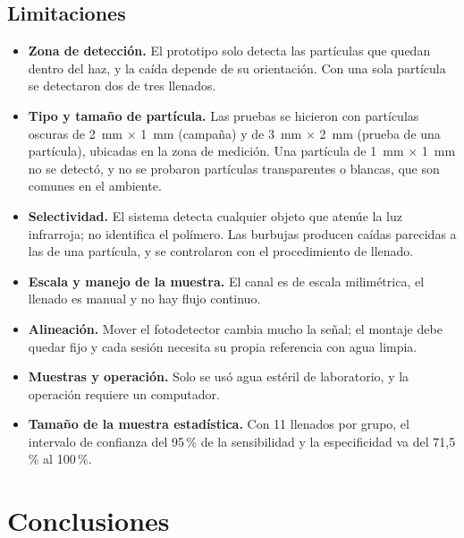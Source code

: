 \subsection{Limitaciones}

\begin{itemize}
  \item \textbf{Zona de detección.} El prototipo solo detecta las partículas que quedan
    dentro del haz, y la caída depende de su orientación. Con una sola partícula se
    detectaron dos de tres llenados.
  \item \textbf{Tipo y tamaño de partícula.} Las pruebas se hicieron con partículas
    oscuras de 2~mm $\times$ 1~mm (campaña) y de 3~mm $\times$ 2~mm (prueba de una
    partícula), ubicadas en la zona de medición. Una partícula de 1~mm
    $\times$ 1~mm no se detectó, y no se probaron partículas transparentes o blancas,
    que son comunes en el ambiente.
  \item \textbf{Selectividad.} El sistema detecta cualquier objeto que atenúe la luz
    infrarroja; no identifica el polímero. Las burbujas producen caídas parecidas a las
    de una partícula, y se controlaron con el procedimiento de llenado.
  \item \textbf{Escala y manejo de la muestra.} El canal es de escala milimétrica, el
    llenado es manual y no hay flujo continuo.
  \item \textbf{Alineación.} Mover el fotodetector cambia mucho la señal; el montaje debe
    quedar fijo y cada sesión necesita su propia referencia con agua limpia.
  \item \textbf{Muestras y operación.} Solo se usó agua estéril de laboratorio, y la
    operación requiere un computador.
  \item \textbf{Tamaño de la muestra estadística.} Con 11 llenados por grupo, el
    intervalo de confianza del 95\,\% de la sensibilidad y la especificidad va del 71,5\,\%
    al 100\,\%.
\end{itemize}



\section{Conclusiones}

